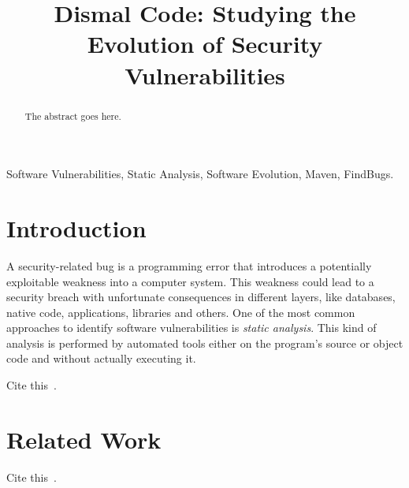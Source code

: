 \documentclass[conference]{IEEEtran}
\begin{document}
\title{Dismal Code: Studying the Evolution of Security Vulnerabilities}


\author{
\and
{}
}

\maketitle

\begin{abstract}
The abstract goes here.
\end{abstract}

\begin{IEEEkeywords}
Software Vulnerabilities, Static Analysis, Software Evolution, Maven, FindBugs.
\end{IEEEkeywords}

\IEEEpeerreviewmaketitle

\section{Introduction}

A security-related bug is a programming error that introduces a potentially
exploitable weakness into a computer system. This weakness could lead to a
security breach with unfortunate consequences in different layers, like databases,
native code, applications, libraries and others. One of the most common
approaches to identify software vulnerabilities is {\it static analysis}. This
kind of analysis is performed by automated tools either on the program's source
or object code and without actually executing it.

Cite this~\cite{MNN11}.

\section{Related Work}

Cite this~\cite{ZAH11}.
\end{document}
